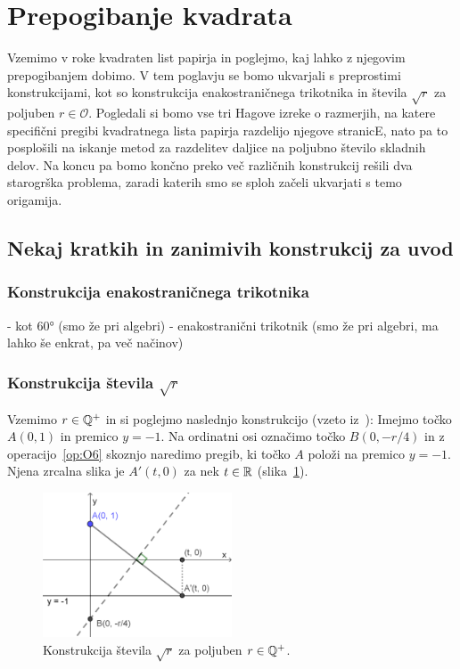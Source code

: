 \section{Prepogibanje kvadrata}
\label{pogl:prepog_kvadrata}

Vzemimo v roke kvadraten list papirja in poglejmo, kaj lahko z njegovim prepogibanjem dobimo. V tem poglavju se bomo ukvarjali s preprostimi konstrukcijami, kot so konstrukcija enakostraničnega trikotnika in števila $\sqrt{r}$ za poljuben $r \in \mathcal{O}$. Pogledali si bomo vse tri Hagove izreke o razmerjih, na katere specifični pregibi kvadratnega lista papirja razdelijo njegove stranicE, nato pa to posplošili na iskanje metod za razdelitev daljice na poljubno število skladnih delov. Na koncu pa bomo končno preko več različnih konstrukcij rešili dva starogrška problema, zaradi katerih smo se sploh začeli ukvarjati s temo origamija.

\subsection{Nekaj kratkih in zanimivih konstrukcij za uvod}

\subsubsection*{Konstrukcija enakostraničnega trikotnika}

- kot 60° (smo že pri algebri)
- enakostranični trikotnik (smo že pri algebri, ma lahko še enkrat, pa več načinov)

\subsubsection*{Konstrukcija števila $\sqrt{r}$}

Vzemimo $r \in \mathbb Q^+$ in si poglejmo naslednjo konstrukcijo (vzeto iz~\cite[str.\ 58]{hull2013}):
Imejmo točko $A (0, 1) $ in premico $y = -1$. Na ordinatni osi označimo točko $B (0, -r/4)$ in z operacijo~\ref{op:O6} skoznjo naredimo pregib, ki točko $A$ položi na premico $y = -1$. Njena zrcalna slika je $A' (t, 0) $ za nek $t \in \mathbb R$ (slika~\ref{fig:konstrukcija_korena}).

\begin{figure}[h]
    \centering
    \includegraphics[width=0.5\textwidth]{images/kvadratni_koren.png}
    \caption[Konstrukcija korena]{Konstrukcija števila $\sqrt{r}$ za poljuben $r \in \mathbb Q^{+}$.}
    \label{fig:konstrukcija_korena}
\end{figure}

